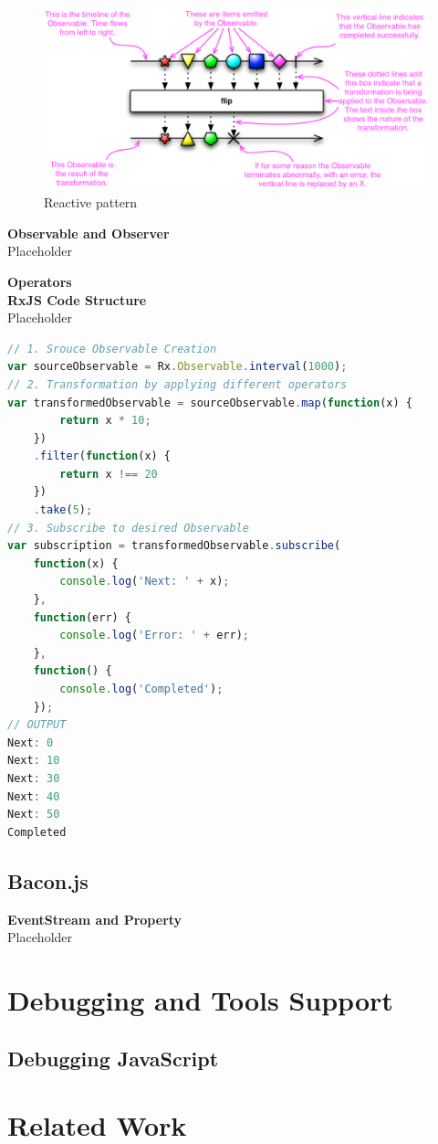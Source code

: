 \begin{figure}[!h]
	\centering
	\includegraphics[scale=0.5,trim=0 0 0 0]{gfx/rxjs-reactive-pattern2.png}
	\caption{Reactive pattern \protect\cite{ReactiveXobservable}}
	\label{fig:rxjs-reactive-pattern}
\end{figure}

\textbf{Observable and Observer}\\
Placeholder

\textbf{Operators}
\label{subsec:Operators}\\

\textbf{RxJS Code Structure}\\
Placeholder
\begin{lstlisting}[language=JavaScript, caption=RxJS Simple Example, label={lst:RxJS_Simple_Example}]
// 1. Srouce Observable Creation
var sourceObservable = Rx.Observable.interval(1000);
// 2. Transformation by applying different operators
var transformedObservable = sourceObservable.map(function(x) {
		return x * 10;
	})
	.filter(function(x) {
		return x !== 20
	})
	.take(5);
// 3. Subscribe to desired Observable 
var subscription = transformedObservable.subscribe(
	function(x) {
		console.log('Next: ' + x);
	},
	function(err) {
		console.log('Error: ' + err);
	},
	function() {
		console.log('Completed');
	});
// OUTPUT
Next: 0
Next: 10
Next: 30
Next: 40
Next: 50
Completed
\end{lstlisting}

\subsection{Bacon.js}

\textbf{EventStream and Property}\\
Placeholder

\section{Debugging and Tools Support}

\subsection{Debugging JavaScript}

\section{Related Work}





